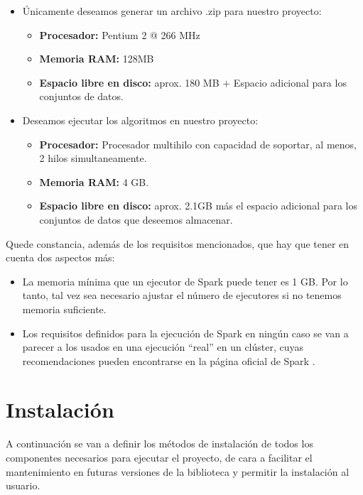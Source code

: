 \begin{itemize}
\item Únicamente deseamos generar un archivo .zip para nuestro proyecto:
	\begin{itemize}
	\item \textbf{Procesador:} Pentium 2 @ 266 MHz \cite{minRequerimentsJava}
	\item \textbf{Memoria RAM:} 128MB \cite{minRequerimentsJava}
	\item \textbf{Espacio libre en disco:} aprox. 180 MB $+$ Espacio adicional para los conjuntos de datos.
	\end{itemize}
\item Deseamos ejecutar los algoritmos en nuestro proyecto:
	\begin{itemize}
	\item \textbf{Procesador:} Procesador multihilo con capacidad de soportar, al menos, 2 hilos simultaneamente.
	\item \textbf{Memoria RAM:} 4 GB.
	\item \textbf{Espacio libre en disco:} aprox. 2.1GB más el espacio adicional para los conjuntos de datos que deseemos almacenar.
	\end{itemize}
\end{itemize}

Quede constancia, además de los requisitos mencionados, que hay que tener en cuenta dos aspectos más:
\begin{itemize}
\item La memoria mínima que un ejecutor de Spark puede tener es 1 GB. Por lo tanto, tal vez sea necesario ajustar el número de ejecutores si no tenemos memoria suficiente.
\item Los requisitos definidos para la ejecución de Spark en ningún caso se van a parecer a los usados en una ejecución ``real'' en un clúster, cuyas recomendaciones pueden encontrarse en la página oficial de Spark \cite{requisitosSpark}.
\end{itemize}


\section{Instalación}\label{sec:Instalacion}

A continuación se van a definir los métodos de instalación de todos los componentes necesarios para ejecutar el proyecto, de cara a facilitar el mantenimiento en futuras versiones de la biblioteca y permitir la instalación al usuario.

